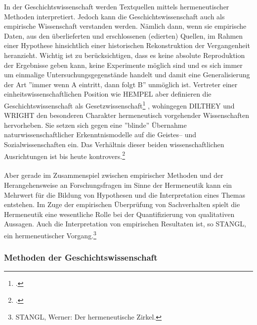 \documentclass[12pt,a4paper]{article}
\begin{document}
In der Geschichtswissenschaft werden Textquellen mittels hermeneutischer Methoden interpretiert. Jedoch kann die Geschichtswissenschaft auch als empirische Wissenschaft verstanden werden. Nämlich dann, wenn sie empirische Daten, aus den überlieferten und erschlossenen (edierten) Quellen, im Rahmen einer Hypothese hinsichtlich einer historischen Rekonstruktion der Vergangenheit heranzieht. Wichtig ist zu berücksichtigen, dass es keine absolute Reproduktion der Ergebnisse geben kann, keine Experimente möglich sind und es sich immer um einmalige Untersuchungsgegenstände handelt und damit eine Generalisierung der Art ''immer wenn A eintritt, dann folgt B'' unmöglich ist. Vertreter einer einheitswissenschaftlichen Position wie HEMPEL aber definieren die Geschichtswissenschaft als Gesetzwissenschaft\footcite[][S.79-80]{nussel2018offenbarung} , wohingegen DILTHEY und WRIGHT den besonderen Charakter hermeneutisch vorgehender Wissenschaften hervorheben. Sie setzen sich gegen eine ''blinde'' Übernahme naturwissenschaftlicher Erkenntnismodelle auf die Geistes-- und Sozialwissenschaften ein. Das Verhältnis dieser beiden wissenschaftlichen Ausrichtungen ist bis heute kontrovers.\footcite{wellmer1979georg}
\\
\\
Aber gerade im Zusammenspiel zwischen empirischer Methoden und der Herangehensweise an Forschungsfragen im Sinne der Hermeneutik kann ein Mehrwert für die Bildung von Hypothesen und die Interpretation eines Themas entstehen. Im Zuge der empirischen Überprüfung von Sachverhalten spielt die Hermeneutik eine wesentliche Rolle bei der Quantifizierung von qualitativen Aussagen. Auch die Interpretation von empirischen Resultaten ist, so STANGL, ein hermeneutischer Vorgang.\footnote{STANGL, Werner: Der hermeneutische Zirkel.}

\subsubsection{Methoden der Geschichtswissenschaft}
\label{ref:Methoden}
\end{document}
